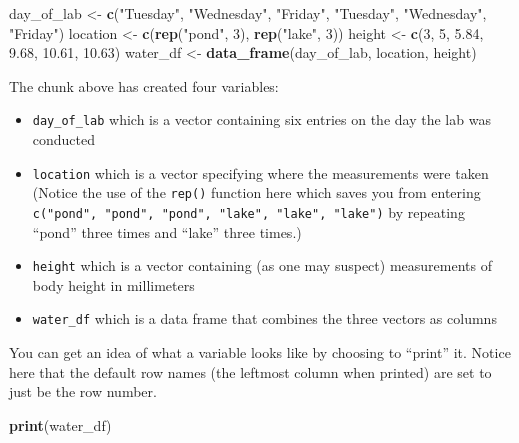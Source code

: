 \documentclass[twoside, 12pt]{article}
\newenvironment{Shaded}{\begin{snugshade}}{\end{snugshade}}
\newcommand{\KeywordTok}[1]{\textcolor[rgb]{0.13,0.29,0.53}{\textbf{{#1}}}}
\newcommand{\DecValTok}[1]{\textcolor[rgb]{0.00,0.00,0.81}{{#1}}}
\newcommand{\FloatTok}[1]{\textcolor[rgb]{0.00,0.00,0.81}{{#1}}}
\newcommand{\StringTok}[1]{\textcolor[rgb]{0.31,0.60,0.02}{{#1}}}
\newcommand{\NormalTok}[1]{{#1}}
\providecommand{\tightlist}{%
  \setlength{\itemsep}{0pt}\setlength{\parskip}{0pt}}
\begin{document}
\begin{Shaded}
\begin{Highlighting}[]
\NormalTok{day_of_lab <-}\StringTok{ }\KeywordTok{c}\NormalTok{(}\StringTok{"Tuesday"}\NormalTok{, }\StringTok{"Wednesday"}\NormalTok{, }\StringTok{"Friday"}\NormalTok{, }
                \StringTok{"Tuesday"}\NormalTok{, }\StringTok{"Wednesday"}\NormalTok{, }\StringTok{"Friday"}\NormalTok{)}
\NormalTok{location <-}\StringTok{ }\KeywordTok{c}\NormalTok{(}\KeywordTok{rep}\NormalTok{(}\StringTok{"pond"}\NormalTok{, }\DecValTok{3}\NormalTok{), }\KeywordTok{rep}\NormalTok{(}\StringTok{"lake"}\NormalTok{, }\DecValTok{3}\NormalTok{))}
\NormalTok{height <-}\StringTok{ }\KeywordTok{c}\NormalTok{(}\DecValTok{3}\NormalTok{, }\DecValTok{5}\NormalTok{, }\FloatTok{5.84}\NormalTok{, }\FloatTok{9.68}\NormalTok{, }\FloatTok{10.61}\NormalTok{, }\FloatTok{10.63}\NormalTok{)}
\NormalTok{water_df <-}\StringTok{ }\KeywordTok{data_frame}\NormalTok{(day_of_lab, location, height)}
\end{Highlighting}
\end{Shaded}

The chunk above has created four variables:

\begin{itemize}
\tightlist
\item
  \texttt{day\_of\_lab} which is a vector containing six entries on the
  day the lab was conducted
\item
  \texttt{location} which is a vector specifying where the measurements
  were taken (Notice the use of the \texttt{rep()} function here which
  saves you from entering
  \texttt{c("pond",\ "pond",\ "pond",\ "lake",\ "lake",\ "lake")} by
  repeating ``pond'' three times and ``lake'' three times.)
\item
  \texttt{height} which is a vector containing (as one may suspect)
  measurements of body height in millimeters
\item
  \texttt{water\_df} which is a data frame that combines the three
  vectors as columns
\end{itemize}

You can get an idea of what a variable looks like by choosing to
``print'' it. Notice here that the default row names (the leftmost
column when printed) are set to just be the row number.

\begin{Shaded}
\begin{Highlighting}[]
\KeywordTok{print}\NormalTok{(water_df)}
\end{Highlighting}
\end{Shaded}
\end{document}
